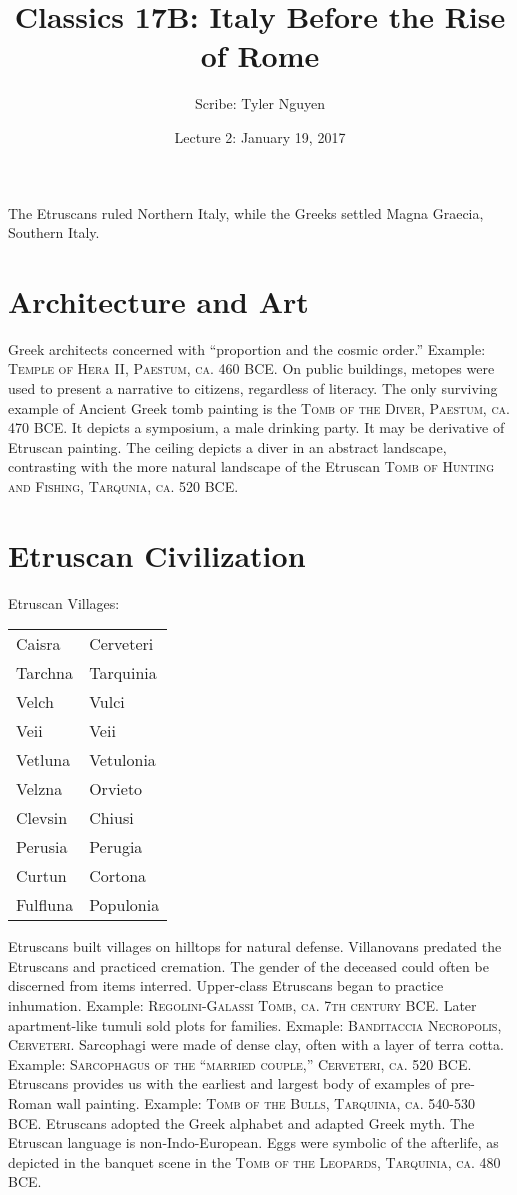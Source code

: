 \documentclass{article}
\begin{document}
\title{Classics 17B: Italy Before the Rise of Rome}
\author{Scribe: Tyler Nguyen}
\date{Lecture 2: January 19, 2017}
\maketitle
The Etruscans ruled Northern Italy, while the Greeks settled Magna Graecia, Southern Italy.
\section{Architecture and Art}
Greek architects concerned with ``proportion and the cosmic order.'' Example: \textsc{Temple of Hera II, Paestum, ca. 460 BCE}.  On public buildings, metopes were used to present a narrative to citizens, regardless of literacy. The only surviving example of Ancient Greek tomb painting is the \textsc{Tomb of the Diver, Paestum, ca. 470 BCE}.  It depicts a symposium, a male drinking party. It may be derivative of Etruscan painting.  The ceiling depicts a diver in an abstract landscape, contrasting with the more natural landscape of the Etruscan \textsc{Tomb of Hunting and Fishing, Tarqunia, ca. 520 BCE}.
\section{Etruscan Civilization}
Etruscan Villages:\\
\begin{tabular}{ll}
Caisra & Cerveteri\\
Tarchna & Tarquinia\\
Velch & Vulci\\
Veii & Veii\\
Vetluna & Vetulonia\\
Velzna & Orvieto\\
Clevsin & Chiusi\\
Perusia & Perugia\\
Curtun & Cortona\\
Fulfluna & Populonia\\
\end{tabular}

Etruscans built villages on hilltops for natural defense. Villanovans predated the Etruscans and practiced cremation. The gender of the deceased could often be discerned from items interred. Upper-class Etruscans began to practice inhumation. Example: \textsc{Regolini-Galassi Tomb, ca. 7th century BCE}. Later apartment-like tumuli sold plots for families. Exmaple: \textsc{Banditaccia Necropolis, Cerveteri}. Sarcophagi were made of dense clay, often with a layer of terra cotta. Example: \textsc{Sarcophagus of the ``married couple,'' Cerveteri, ca. 520 BCE}.  Etruscans provides us with the earliest and largest body of examples of pre-Roman wall painting. Example: \textsc{Tomb of the Bulls, Tarquinia, ca. 540-530 BCE}. Etruscans adopted the Greek alphabet and adapted Greek myth.  The Etruscan language is non-Indo-European. Eggs were symbolic of the afterlife, as depicted in the banquet scene in the \textsc{Tomb of the Leopards, Tarquinia, ca. 480 BCE}.
\end{document}
